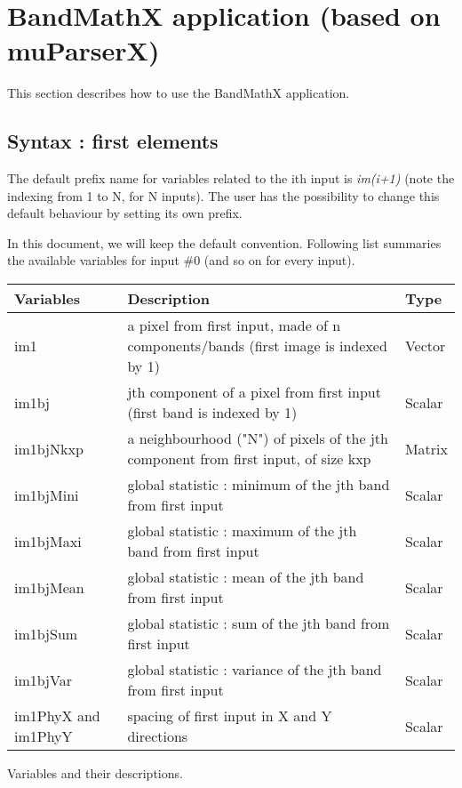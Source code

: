 \newpage
\section{BandMathX application (based on muParserX)}\label{sec:bandmathx}
This section describes how to use the BandMathX application.



\subsection{Syntax : first elements}\label{ssec:syntax}

The default prefix name for variables related to the ith input is \textit{im(i+1)} 
(note the indexing from 1 to N, for N inputs). The user has the 
possibility to change this default behaviour by setting its own prefix.


In this document, we will keep the default convention. Following list 
summaries the available variables for input \#0 (and so on for every input).

\begin{center} 
\begin{tabular}{||l|l|l||}
\hline
\bf Variables & \bf Description & \bf Type \\
\hline\hline
im1 & a pixel from first input, made of n components/bands (first image is indexed by 1) & Vector \\
im1bj & jth component of a pixel from first input (first band is indexed by 1) & Scalar \\
im1bjNkxp & a neighbourhood ("N") of pixels of the jth component from first input, of size kxp & Matrix \\
im1bjMini & global statistic : minimum of the jth band from first input & Scalar \\
im1bjMaxi & global statistic : maximum of the jth band from first input & Scalar \\
im1bjMean & global statistic : mean of the jth band from first input & Scalar \\
im1bjSum & global statistic : sum of the jth band from first input & Scalar \\
im1bjVar & global statistic : variance of the jth band from first input & Scalar \\
im1PhyX and im1PhyY & spacing of first input in X and Y directions & Scalar \\
\hline
\end{tabular}
\end{center}
\caption{Variables and their descriptions.}
\label{variables}

